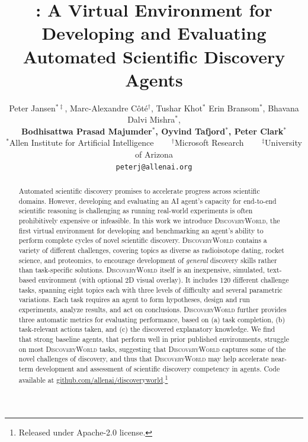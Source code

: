 \documentclass{article}
\title{\env: A Virtual Environment for Developing and Evaluating Automated Scientific Discovery Agents}
\author{%
    Peter Jansen$^{*\ddagger}$, Marc-Alexandre Côté$^{\dagger}$, Tushar Khot$^{*}$ Erin Bransom$^{*}$, Bhavana Dalvi Mishra$^{*}$, \\\textbf{Bodhisattwa Prasad Majumder$^{*}$, Oyvind Tafjord$^{*}$, Peter Clark$^{*}$} \\
    $^{*}$Allen Institute for Artificial Intelligence ~~~ $^{\dagger}$Microsoft Research ~~~ $^{\ddagger}$University of Arizona \\
    \texttt{peterj@allenai.org}
}
\newcommand{\env}{\textsc{DiscoveryWorld}\xspace}
\begin{document}
\maketitle


\begin{abstract}
Automated scientific discovery promises to accelerate progress across scientific domains. However, developing and evaluating an AI agent's
capacity for end-to-end scientific reasoning is challenging as running real-world experiments is often prohibitively expensive or infeasible. In this work we introduce \env,
the first virtual environment for developing and benchmarking an agent's ability to perform complete cycles of novel scientific discovery.
\env contains a variety of different challenges, covering topics as diverse as radioisotope dating, rocket science, and proteomics, to encourage development of {\it general} discovery skills rather than task-specific solutions.
\env itself is an inexpensive, simulated, text-based environment (with optional 2D visual overlay).
  It includes 120 different challenge tasks, spanning eight topics each with three levels of difficulty and
several parametric variations.
Each task requires an agent to form hypotheses, design and run experiments, analyze results, and act on conclusions.
\env further provides three automatic metrics for evaluating performance, based on (a) task completion, (b) task-relevant actions taken, and (c) the discovered explanatory knowledge.
We find that strong baseline agents, that perform well in prior published environments, struggle on most \env tasks,
suggesting that \env captures some of the novel challenges of discovery, and thus that \env may help
accelerate near-term development and assessment of scientific discovery competency in agents.
Code available at \href{https://github.com/allenai/discoveryworld}{github.com/allenai/discoveryworld}.\footnote{Released under Apache-2.0 license.}
\end{abstract}

\end{document}
